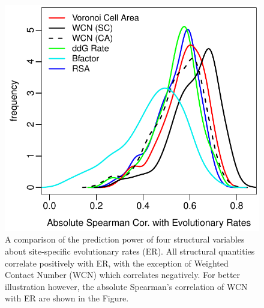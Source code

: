 \documentclass[11pt]{article}
\begin{document}
    \begin{figure}[tbh]
        \begin{center}
        \includegraphics[width=6.9in]{best_structural_predictors_of_ER.pdf}
        \end{center}
        \caption{A comparison of the prediction power of four structural variables about site-specific evolutionary rates (ER). All structural quantities correlate positively with ER, with the exception of Weighted Contact Number (WCN) which correlates negatively. For better illustration however, the absolute Spearman's correlation of WCN with ER are shown in the Figure.}
        \label{fig:best_predictor}
    \end{figure}
\end{document}
